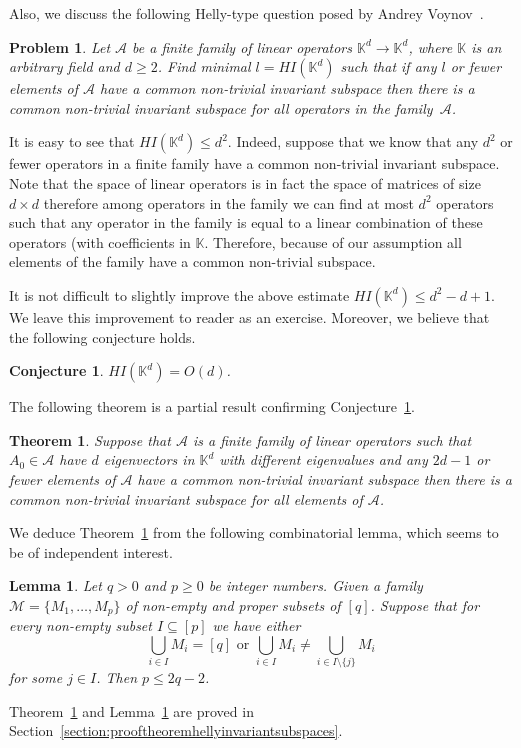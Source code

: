 \documentclass[12pt,nopagetitle]{article}
\theoremstyle{plain}
\newtheorem{theorem}{Theorem}
\newtheorem{lemma}{Lemma}
\newtheorem{problem}{Problem}
\newtheorem{conjecture}{Conjecture}
\theoremstyle{definition}
\begin{document}
Also, we discuss the following Helly-type question posed by Andrey Voynov~\cite{AV}.

\begin{problem}
\label{problem:invariantsubspaces}
Let $\mathcal{A}$ be a finite family of linear operators $\mathbb K^d\to \mathbb K^d$, where $\mathbb K$ is an arbitrary field and $d\geqslant 2$. Find minimal $l=HI(\mathbb K^d)$ such that if any $l$ or fewer elements of $\mathcal{A}$ have a common non-trivial invariant subspace then there is a common non-trivial invariant subspace for all operators in the family~$\mathcal{A}$. 
\end{problem}	
It is easy to see that $HI(\mathbb K^d)\leq d^2$. Indeed, suppose that we know that any $d^2$ or fewer operators in a finite family have a common non-trivial invariant subspace. Note that the space of linear operators is in fact the space of matrices of size $d\times d$ therefore among operators in the family we can find at most $d^2$ operators such that any operator in the family is equal to a linear combination of these operators (with coefficients in $\mathbb K$. Therefore, because of our assumption all elements of the family have a common non-trivial subspace.

It is not difficult to slightly improve the above estimate $HI(\mathbb K^d)\leq d^2-d+1$. We leave this improvement to reader as an exercise. Moreover, we believe that the following conjecture holds.

\begin{conjecture}\label{conjecture:invariantsubspacesarelinear}
$HI(\mathbb K^d)=O(d)$.
\end{conjecture}

The following theorem is a partial result confirming Conjecture~\ref{conjecture:invariantsubspacesarelinear}.

\begin{theorem}\label{theorem:hellyinvariansubspaces}
Suppose that $\mathcal{A}$ is a finite family of linear operators such that $A_0\in \mathcal{A}$ have $d$ eigenvectors in $\mathbb K^d$ with different eigenvalues and any $2d-1$ or fewer elements of $\mathcal{A}$ have a common non-trivial invariant subspace then there is a common non-trivial invariant subspace for all elements of $\mathcal{A}$. 
\end{theorem}
We deduce Theorem~\ref{theorem:hellyinvariansubspaces} from the following combinatorial lemma, which seems to be of independent interest.
\begin{lemma}
\label{lemma:subsets}
	Let $q>0$ and $p\geq 0$ be integer numbers. Given a family $\mathcal{M}=\{M_1, \dots, M_p\}$ of non-empty and proper subsets of $[q]$. Suppose that for every non-empty subset $I\subseteq [p]$ we have either
    $$\bigcup_{i\in I}M_i=[q] \text{ or } \bigcup_{i\in I} M_i\ne \bigcup_{i\in I\setminus\{j\}}M_i$$ for some $j\in I$. Then $p\leqslant 2q-2$.   
\end{lemma}
Theorem~\ref{theorem:hellyinvariansubspaces} and Lemma~\ref{lemma:subsets} are proved in Section~\ref{section:prooftheoremhellyinvariantsubspaces}. 
\end{document}
